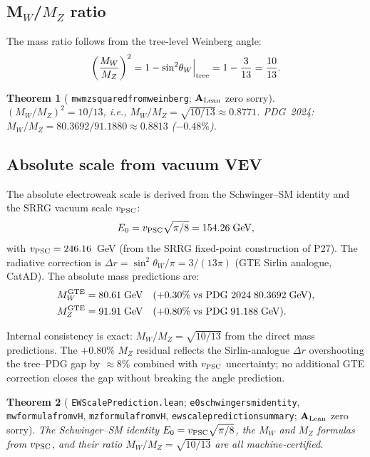 \documentclass[11pt]{article}
\newtheorem{theorem}{Theorem}[section]
\theoremstyle{remark}
\newcommand{\lean}[1]{%
  \penalty-100
  \begingroup\def\_{\textunderscore\allowbreak}\texttt{#1}\endgroup}
\newcommand{\sinwsq}{\sin^2\!\theta_W}
\newcommand{\Mw}{M_W}
\newcommand{\Mz}{M_Z}
\newcommand{\vPSC}{v_{\rm PSC}}
\newcommand{\CatAL}{\ensuremath{\textbf{A}_{\rm Lean}}}
\begin{document}
\subsection{M\texorpdfstring{$_W$/$M_Z$}{W/Z} ratio}
\label{ssec:mwmz}

The mass ratio follows from the tree-level Weinberg angle:
\begin{equation}
  \label{eq:mwmz}
  \left(\frac{\Mw}{\Mz}\right)^2 = 1 - \sinwsq\Big|_{\rm tree} = 1 - \frac{3}{13} = \frac{10}{13}.
\end{equation}

\begin{theorem}[\lean{mw\_mz\_squared\_from\_weinberg}; \CatAL{} zero sorry]
  \label{thm:mwmz}
  $(\Mw/\Mz)^2 = 10/13$, i.e., $\Mw/\Mz=\sqrt{10/13}\approx 0.8771$.
  PDG~2024: $\Mw/\Mz = 80.3692/91.1880 \approx 0.8813$ ($-0.48\%$).
\end{theorem}

\subsection{Absolute scale from vacuum VEV}
\label{ssec:absolute}

The absolute electroweak scale is derived from the Schwinger--SM identity
and the SRRG vacuum scale $\vPSC$:
\begin{equation}
  \label{eq:E0}
  E_0 = \vPSC\sqrt{\pi/8} = 154.26\;\text{GeV},
\end{equation}
with $\vPSC=246.16$~GeV (from the SRRG fixed-point construction of P27).
The radiative correction is $\Delta r = \sinwsq/\pi = 3/(13\pi)$ (GTE
Sirlin analogue, CatAD).  The absolute mass predictions are:
\begin{align}
  \label{eq:Mw_pred}
  \Mw^{\rm GTE} &= 80.61\;\text{GeV} \quad (+0.30\%\;\text{vs PDG~2024}\;80.3692\;\text{GeV}), \\
  \label{eq:Mz_pred}
  \Mz^{\rm GTE} &= 91.91\;\text{GeV} \quad (+0.80\%\;\text{vs PDG}\;91.188\;\text{GeV}).
\end{align}

Internal consistency is exact: $\Mw/\Mz=\sqrt{10/13}$ from the direct mass
predictions.  The $+0.80\%$ $M_Z$ residual reflects the Sirlin-analogue
$\Delta r$ overshooting the tree--PDG gap by $\approx8\%$ combined with
$\vPSC$ uncertainty; no additional GTE correction closes the gap without
breaking the angle prediction.

\begin{theorem}[\lean{EWScalePrediction.lean};
  \lean{e0\_schwinger\_sm\_identity}, \lean{mw\_formula\_from\_vH},
  \lean{mz\_formula\_from\_vH}, \lean{ew\_scale\_prediction\_summary};
  \CatAL{} zero sorry]
  \label{thm:ew_scale}
  The Schwinger--SM identity $E_0=\vPSC\sqrt{\pi/8}$, the $\Mw$ and $\Mz$
  formulas from $\vPSC$, and their ratio $\Mw/\Mz=\sqrt{10/13}$ are all
  machine-certified.
\end{theorem}
\end{document}
